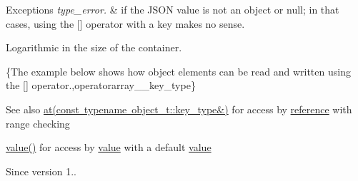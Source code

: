 \begin{DoxyExceptions}{Exceptions}
{\em type\+\_\+error.} & if the J\+S\+ON value is not an object or null; in that cases, using the \mbox{[}\mbox{]} operator with a key makes no sense.\\
\hline
\end{DoxyExceptions}
Logarithmic in the size of the container.

\{The example below shows how object elements can be read and written using the {\ttfamily \mbox{[}\mbox{]}} operator.,operatorarray\+\_\+\+\_\+key\+\_\+type\}

\begin{DoxySeeAlso}{See also}
\mbox{\hyperlink{classnlohmann_1_1basic__json_a93403e803947b86f4da2d1fb3345cf2c}{at(const typename object\+\_\+t\+::key\+\_\+type\&)}} for access by \mbox{\hyperlink{classnlohmann_1_1basic__json_ac6a5eddd156c776ac75ff54cfe54a5bc}{reference}} with range checking 

\mbox{\hyperlink{classnlohmann_1_1basic__json_adcf8ca5079f5db993820bf50036bf45d}{value()}} for access by \mbox{\hyperlink{classnlohmann_1_1basic__json_adcf8ca5079f5db993820bf50036bf45d}{value}} with a default \mbox{\hyperlink{classnlohmann_1_1basic__json_adcf8ca5079f5db993820bf50036bf45d}{value}}
\end{DoxySeeAlso}
\begin{DoxySince}{Since}
version 1.. 
\end{DoxySince}
\mbox{\label{classnlohmann_1_1basic__json_a26554213cbb1722accc460ce348c860a}} 

